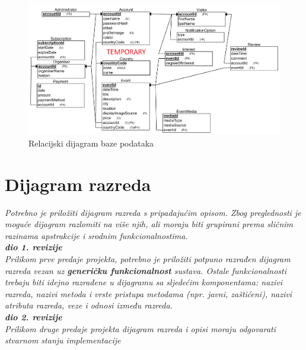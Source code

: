 				\begin{figure}[htbp]
					\centering
					\includegraphics[width=1\textwidth]{dijagrami/rel_dijagram.png}
					\caption{Relacijski dijagram baze podataka}
					\label{fig:my_image}
				\end{figure}
				
				
	
			\eject
			
			
		\section{Dijagram razreda}
		
			\textit{Potrebno je priložiti dijagram razreda s pripadajućim opisom. Zbog preglednosti je moguće dijagram razlomiti na više njih, ali moraju biti grupirani prema sličnim razinama apstrakcije i srodnim funkcionalnostima.}\\
			
			\textbf{\textit{dio 1. revizije}}\\
			
			\textit{Prilikom prve predaje projekta, potrebno je priložiti potpuno razrađen dijagram razreda vezan uz \textbf{generičku funkcionalnost} sustava. Ostale funkcionalnosti trebaju biti idejno razrađene u dijagramu sa sljedećim komponentama: nazivi razreda, nazivi metoda i vrste pristupa metodama (npr. javni, zaštićeni), nazivi atributa razreda, veze i odnosi između razreda.}\\
			
			\textbf{\textit{dio 2. revizije}}\\			
			
			\textit{Prilikom druge predaje projekta dijagram razreda i opisi moraju odgovarati stvarnom stanju implementacije}
			
			
			
			\eject
		
